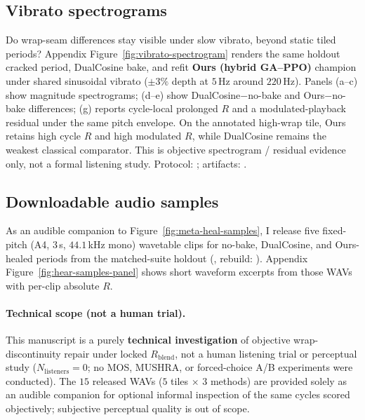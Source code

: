 
\subsection{Vibrato spectrograms}
\label{sec:vibrato-eval}

Do wrap-seam differences stay visible under slow vibrato, beyond static tiled periods?
Appendix Figure~\ref{fig:vibrato-spectrogram} renders the same holdout cracked period, DualCosine bake, and refit \textbf{Ours (hybrid GA--PPO)} champion under shared sinusoidal vibrato ($\pm 3\%$ depth at $5$\,Hz around $220$\,Hz).
Panels (a--c) show magnitude spectrograms; (d--e) show DualCosine$-$no-bake and Ours$-$no-bake differences; (g) reports cycle-local prolonged $R$ and a modulated-playback residual under the same pitch envelope.
On the annotated high-wrap tile, Ours retains high cycle $R$ and high modulated $R$, while DualCosine remains the weakest classical comparator.
This is objective spectrogram / residual evidence only, not a formal listening study.
Protocol:
;
artifacts:
.

\subsection{Downloadable audio samples}
\label{sec:hear-samples}

As an audible companion to Figure~\ref{fig:meta-heal-samples}, I release five fixed-pitch (A4, $3$\,s, $44.1$\,kHz mono) wavetable clips for no-bake, DualCosine, and Ours-healed periods from the matched-suite holdout
(,
rebuild:
).
Appendix Figure~\ref{fig:hear-samples-panel} shows short waveform excerpts from those WAVs with per-clip absolute $R$.

\paragraph{Technical scope (not a human trial).}
This manuscript is a purely \textbf{technical investigation} of objective wrap-discontinuity repair under locked $R_{\mathrm{blend}}$, not a human listening trial or perceptual study ($N_{\mathrm{listeners}}{=}0$; no MOS, MUSHRA, or forced-choice A/B experiments were conducted).
The $15$ released WAVs ($5$ tiles $\times$ $3$ methods) are provided solely as an audible companion for optional informal inspection of the same cycles scored objectively; subjective perceptual quality is out of scope.

